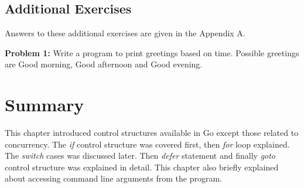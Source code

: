 \subsection{Additional Exercises}

Answers to these additional exercises are given in the Appendix A.

\textbf{Problem 1:} Write a program to print greetings based on time.
Possible greetings are Good morning, Good afternoon and Good evening.

\section*{Summary}

This chapter introduced control structures available in Go except
those related to concurrency.  The \textit{if} control structure was
covered first, then \textit{for} loop explained.  The \textit{switch}
cases was discussed later.  Then \textit{defer} statement and
finally \textit{goto} control structure was explained in detail.  This
chapter also briefly explained about accessing command line arguments
from the program.
